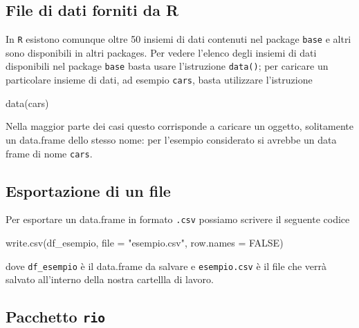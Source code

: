 \documentclass[
  11pt,
]{krantz}
\makeatletter
\newenvironment{Shaded}{\begin{snugshade}}{\end{snugshade}}
\newcommand{\AttributeTok}[1]{\textcolor[rgb]{0.61,0.61,0.61}{#1}}
\newcommand{\ConstantTok}[1]{\textcolor[rgb]{0,0,0}{#1}}
\newcommand{\FunctionTok}[1]{\textcolor[rgb]{0,0,0}{#1}}
\newcommand{\NormalTok}[1]{#1}
\newcommand{\StringTok}[1]{\textcolor[rgb]{0.5,0.5,0.5}{#1}}
\newenvironment{kframe}{%
\medskip{}
\setlength{\fboxsep}{.8em}
 \def\at@end@of@kframe{}%
 \ifinner\ifhmode%
  \def\at@end@of@kframe{\end{minipage}}%
  \begin{minipage}{\columnwidth}%
 \fi\fi%
 \def\FrameCommand##1{\hskip\@totalleftmargin \hskip-\fboxsep
 \colorbox{shadecolor}{##1}\hskip-\fboxsep
     \hskip-\linewidth \hskip-\@totalleftmargin \hskip\columnwidth}%
 \MakeFramed {\advance\hsize-\width
   \@totalleftmargin\z@ \linewidth\hsize
   \@setminipage}}%
 {\par\unskip\endMakeFramed%
 \at@end@of@kframe}
\renewenvironment{Shaded}{\begin{kframe}}{\end{kframe}}
\theoremstyle{definition}
\theoremstyle{definition}
\theoremstyle{definition}
\theoremstyle{definition}
\theoremstyle{remark}
\makeatother
\begin{document}
\hypertarget{file-di-dati-forniti-da-r}{%
\subsection{File di dati forniti da R}\label{file-di-dati-forniti-da-r}}

In \texttt{R} esistono comunque oltre 50 insiemi di dati contenuti nel package \texttt{base} e altri sono disponibili in altri packages. Per vedere l'elenco degli insiemi di dati disponibili nel package \texttt{base} basta usare l'istruzione \texttt{data()}; per caricare un particolare insieme di dati, ad esempio \texttt{cars}, basta utilizzare l'istruzione

\begin{Shaded}
\begin{Highlighting}[]
\FunctionTok{data}\NormalTok{(cars)}
\end{Highlighting}
\end{Shaded}

Nella maggior parte dei casi questo corrisponde a caricare un oggetto, solitamente un data.frame dello stesso nome: per l'esempio considerato si avrebbe un data frame di nome \texttt{cars}.

\hypertarget{esportazione-di-un-file}{%
\subsection{Esportazione di un file}\label{esportazione-di-un-file}}

Per esportare un data.frame in formato \texttt{.csv} possiamo scrivere il seguente codice

\begin{Shaded}
\begin{Highlighting}[]
\FunctionTok{write.csv}\NormalTok{(df\_esempio, }\AttributeTok{file =} \StringTok{"esempio.csv"}\NormalTok{, }\AttributeTok{row.names =} \ConstantTok{FALSE}\NormalTok{)}
\end{Highlighting}
\end{Shaded}

dove \texttt{df\_esempio} è il data.frame da salvare e \texttt{esempio.csv} è il file che verrà salvato all'interno della nostra cartellla di lavoro.

\hypertarget{pacchetto-rio}{%
\subsection{\texorpdfstring{Pacchetto \texttt{rio}}{Pacchetto rio}}\label{pacchetto-rio}}
\end{document}
